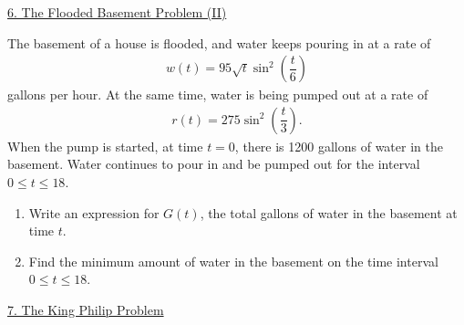 \begin{center}
    \underline{6. The Flooded Basement Problem (II)}
\end{center}

The basement of a house is flooded, and water keeps pouring in at a rate of \begin{align*}
    w(t) = 95\sqrt{t}\sin^2 \left(\dfrac{t}{6}\right)
\end{align*}
gallons per hour. At the same time, water is being pumped out at a rate of \begin{align*}
    r(t) = 275\sin^2 \left(\dfrac{t}{3}\right).
\end{align*}
When the pump is started, at time $t = 0$, there is 1200 gallons of water in the basement. Water continues to pour in and be pumped out for the interval $0 \leq t \leq 18$. \\
\begin{enumerate}[label=\hspace{11pt}(\alph*), align=left, leftmargin=*, labelsep=0.25em]
    \item Write an expression for $G(t)$, the total gallons of water in the basement at time $t$.
    \item Find the minimum amount of water in the basement on the time interval $0 \leq t \leq 18$.
\end{enumerate} \vspace{11pt}

\begin{center}
    \underline{7. The King Philip Problem}
\end{center}

